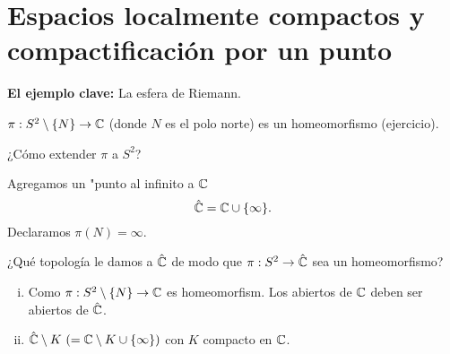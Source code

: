 
\section{Espacios localmente compactos y compactificación por un punto}
\textbf{El ejemplo clave:} La esfera de Riemann.

\begin{recordar}
	$\pi : S^2 \setminus \{N\} \to \mathbb{C}$ (donde $N$ es el polo norte) es un homeomorfismo (ejercicio). 
\end{recordar}

\begin{pregunta}
	¿Cómo extender $\pi$ a $S^2$?
\end{pregunta}
\begin{idea}
	Agregamos un "punto al infinito a $\mathbb{C}$
	\[ \hat{\mathbb{C}} = \mathbb{C} \cup \{\infty\}. \]
	Declaramos $\pi(N) = \infty$.
\end{idea}

\begin{pregunta}
	¿Qué topología le damos a $\hat{\mathbb{C}}$ de modo que $\pi : S^2 \to \hat{\mathbb{C}}$ sea un homeomorfismo?
\end{pregunta}
\begin{enumerate}[i.]
	\item Como $\pi : S^2 \setminus \{N\} \to \mathbb{C}$ es homeomorfism. Los abiertos de $\mathbb{C}$ deben ser abiertos de $\hat{\mathbb{C}}$.
	
	\item $\hat{\mathbb{C}} \setminus K \ (= \mathbb{C} \setminus K \cup \{\infty\})$ con $K$ compacto en $\mathbb{C}$.
\end{enumerate}


